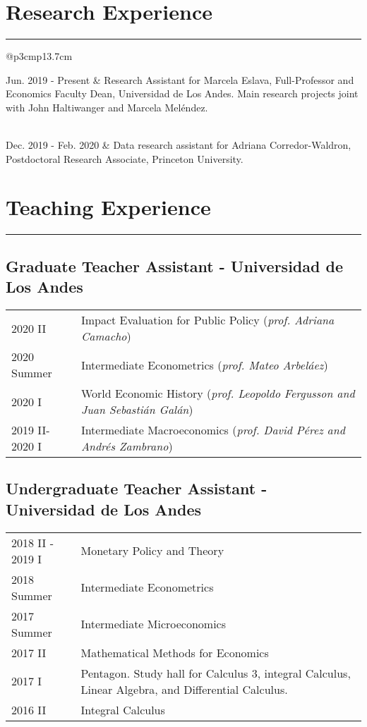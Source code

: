 \documentclass[12pt, letterpaper]{article}
\begin{document}
\section*{Research Experience}
\vspace*{-8mm}
\noindent \rule{\linewidth}{0.2mm}
\noindent
\begin{tabular}{@{}p{3cm}p{13.7cm}}
\raggedright{Jun. 2019 - Present} &  Research Assistant for Marcela Eslava, Full-Professor and Economics Faculty Dean, Universidad de Los Andes. Main research projects joint with John Haltiwanger and Marcela Meléndez.  \\ 
\\ [-3mm]
\raggedright{Dec. 2019 - \newline Feb. 2020} & Data research assistant for Adriana Corredor-Waldron, Postdoctoral Research Associate, Princeton University.
\end{tabular}

\vspace*{-2mm}

\section*{Teaching Experience}
\vspace*{-8mm}
\noindent \rule{\linewidth}{0.2mm}
\vspace*{-12mm}
\subsection*{Graduate Teacher Assistant - Universidad de Los Andes}
\vspace*{-2mm}
\noindent
\begin{tabular}{@{}p{3cm}p{13.7cm}}
2020 II & Impact Evaluation for Public Policy (\textit{prof. Adriana Camacho}) \\
2020 Summer & Intermediate Econometrics (\textit{prof. Mateo Arbeláez}) \\
2020 I & World Economic History (\small{\textit{prof. Leopoldo Fergusson and Juan Sebastián Galán}}) \\
2019 II-2020 I & Intermediate Macroeconomics (\textit{prof. David Pérez and Andrés Zambrano}) 
\end{tabular}
\vspace*{-4mm}
\subsection*{Undergraduate Teacher Assistant - Universidad de Los Andes}
\vspace*{-2mm}
\noindent
\begin{tabular}{@{}p{3cm}p{13.7cm}}
2018 II - 2019 I 	&  		Monetary Policy and Theory \\
2018 Summer			& 		Intermediate Econometrics \\
2017 Summer			& 		Intermediate Microeconomics \\
2017 II				& 		Mathematical Methods for Economics \\ 
2017 I 				& 		Pentagon. Study hall for Calculus 3, integral Calculus, Linear Algebra, and Differential Calculus. \\
2016 II 			& 		Integral Calculus 
\end{tabular}
\end{document}
